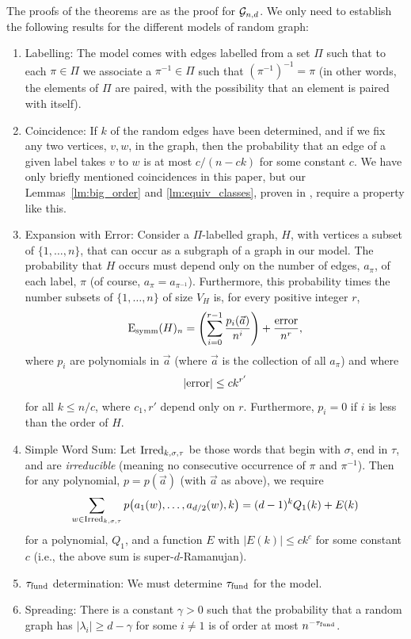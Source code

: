 \documentclass[12pt]{article}
\newcommand{\dtreelike}{{$d$-Ramanujan}}
\newcommand{\cg}{{\cal G}}
\newcommand{\cgnd}{\cg_{n,d}}
\newcommand{\fund}{{\rm fund}}
\newcommand{\taufund}{{\tau_\fund}}
\newcommand{\Esymm}{{\rm E}_{\rm symm}}
\newcommand{\intn}{{\{1,\ldots,n\}}}
\newcommand{\ird}[1]{{\rm Irred}_{#1}}
\begin{document}
The proofs of the theorems are as the proof for $\cgnd$.
We only need to establish the following results for the different models
of random graph:
\begin{enumerate}
\item Labelling:
The model comes with edges labelled from a set $\Pi$ such that
to each $\pi\in\Pi$ we associate a $\pi^{-1}\in\Pi$ such that
$(\pi^{-1})^{-1}=\pi$ (in other words,
the elements of $\Pi$ are paired, with the possibility that an element
is paired with itself).
\item Coincidence: If $k$ of the random edges have been determined,
and if we fix any two vertices, $v,w$,
in the graph, then the probability that an
edge of a given label takes $v$ to $w$ is at most $c/(n-ck)$ for some
constant $c$.  We have only briefly mentioned coincidences in this paper, but
our Lemmas~\ref{lm:big_order} and \ref{lm:equiv_classes}, proven in
\cite{friedman_random_graphs}, require a property like this.
\item Expansion with Error:
Consider a $\Pi$-labelled graph, $H$, with vertices a subset of $\intn$,
that can occur as a subgraph of a graph in our model.
The probability that $H$ occurs must 
depend only on the
number of edges, $a_\pi$, of each label, $\pi$ (of course, 
$a_\pi=a_{\pi^{-1}}$).  Furthermore, this probability
times the number subsets of $\intn$ of size $V_H$ is, for every positive 
integer $r$,
$$
\Esymm(H)_n = \left(\sum_{i=0}^{r-1} \frac{p_i(\vec a)}{n^i}\right)
+ \frac{{\rm error}}{n^r},
$$
where $p_i$ are polynomials in $\vec a$ (where $\vec a$ is the collection
of all $a_\pi$) and where 
$$
|{\rm error}| \le c k^{r'}
$$
for all $k\le n/c$, where $c_1,r'$ depend only on $r$.
Furthermore, $p_i=0$
if $i$ is less than the order of $H$.
\item Simple Word Sum:
Let $\ird{k,\sigma,\tau}$ be those words that begin with $\sigma$, end
in $\tau$, and are {\em irreducible} (meaning no consecutive occurrence of
$\pi$ and $\pi^{-1}$).  Then for any polynomial, $p=p(\vec a)$ (with
$\vec a$ as above), we require
\begin{equation}\label{eq:simple_word}
\sum_{w\in\ird{k,\sigma,\tau}} p\bigl( a_1(w),\ldots,a_{d/2}(w),k\bigr)
= (d-1)^k Q_1(k)+ E(k)
\end{equation}
for a polynomial, $Q_1$, and a function $E$ with $|E(k)|\le ck^c$ for
some constant $c$ (i.e., the above sum is super-{\dtreelike}).
\item $\taufund$ determination:
We must determine $\taufund$ for the model.
\item Spreading: 
There is a constant $\gamma>0$ such that the probability that a
random graph has $|\lambda_i|\ge d-\gamma$ for some $i\ne 1$ is of order
at most $n^{-\taufund}$.
\end{enumerate}
\end{document}
